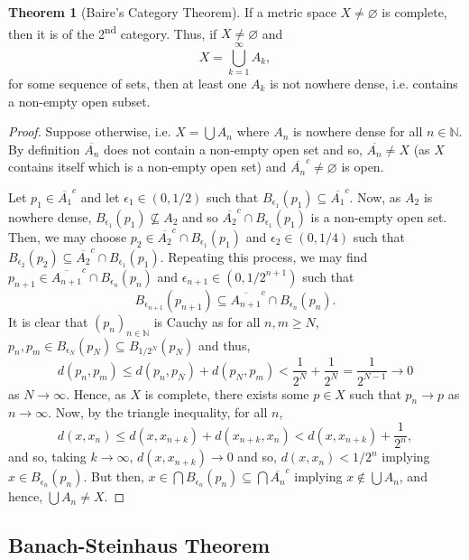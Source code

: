 \documentclass[]{article}
\theoremstyle{definition}
\newtheorem{theorem}{Theorem}
\theoremstyle{definition}
\begin{document}
\begin{theorem}[Baire's Category Theorem]
  If a metric space \(X \neq \varnothing\) is complete, then it is of 
  the 2\textsuperscript{nd} category. Thus, if \(X \neq \varnothing\) and 
  \[X = \bigcup_{k = 1}^\infty A_k,\]
  for some sequence of sets, then at least one \(A_k\) is not nowhere 
  dense, i.e. contains a non-empty open subset.
\end{theorem}
\begin{proof}
  Suppose otherwise, i.e. \(X = \bigcup A_n\) where \(A_n\) is nowhere dense 
  for all \(n \in \mathbb{N}\). By definition \(\overline{A_n}\) does not 
  contain a non-empty open set and so, \(\overline{A_n} \neq X\) (as 
  \(X\) contains itself which is a non-empty open set) and 
  \(\overline{A_n}^c \neq \varnothing\) is open. 

  Let \(p_1 \in \overline{A_1}^c\) and let \(\epsilon_1 \in (0, 1/2)\) such 
  that \(B_{\epsilon_1}(p_1) \subseteq \overline{A_1}^c\). Now, as 
  \(A_2\) is nowhere dense, \(B_{\epsilon_1}(p_1) \not\subseteq A_2\) and 
  so \(\overline{A_2}^c \cap B_{\epsilon_1}(p_1)\) is a non-empty open 
  set. Then, we may choose \(p_2 \in \overline{A_2}^c \cap B_{\epsilon_1}(p_1)\) 
  and \(\epsilon_2 \in (0, 1/4)\) such that \(B_{\epsilon_2}(p_2) \subseteq 
  \overline{A_2}^c \cap B_{\epsilon_1}(p_1)\). Repeating this process, we 
  may find \(p_{n + 1} \in \overline{A_{n + 1}}^c \cap B_{\epsilon_n}(p_n)\) 
  and \(\epsilon_{n + 1} \in (0, 1/2^{n + 1})\) such that 
  \[B_{\epsilon_{n + 1}}(p_{n + 1}) \subseteq 
  \overline{A_{n + 1}}^c \cap B_{\epsilon_n}(p_n).\]
  It is clear that \((p_n)_{n \in \mathbb{N}}\) is Cauchy as for all 
  \(n, m \ge N\), \(p_n, p_m \in B_{\epsilon_N}(p_N) \subseteq 
  B_{1/2^N}(p_N)\) and thus,
  \[d(p_n, p_m) \le d(p_n, p_N) + d(p_N, p_m) < 
  \frac{1}{2^N} + \frac{1}{2^N} = \frac{1}{2^{N - 1}} \to 0\]
  as \(N \to \infty\). Hence, as \(X\) is complete, there exists some 
  \(p \in X\) such that \(p_n \to p\) as \(n \to \infty\). Now, by the 
  triangle inequality, for all \(n\), 
  \[d(x, x_n) \le d(x, x_{n + k}) + d(x_{n + k}, x_n) < 
  d(x, x_{n + k}) + \frac{1}{2^n},\]
  and so, taking \(k\to \infty\), \(d(x, x_{n + k}) \to 0\) and so, 
  \(d(x, x_n) < 1/2^n\) implying \(x \in B_{\epsilon_n}(p_n)\). But then, 
  \(x \in \bigcap B_{\epsilon_n}(p_n) \subseteq \bigcap \overline{A_n}^c\) 
  implying \(x \not\in \bigcup A_n\), and hence, \(\bigcup A_n \neq X\).
\end{proof}

\subsection{Banach-Steinhaus Theorem}
\end{document}
